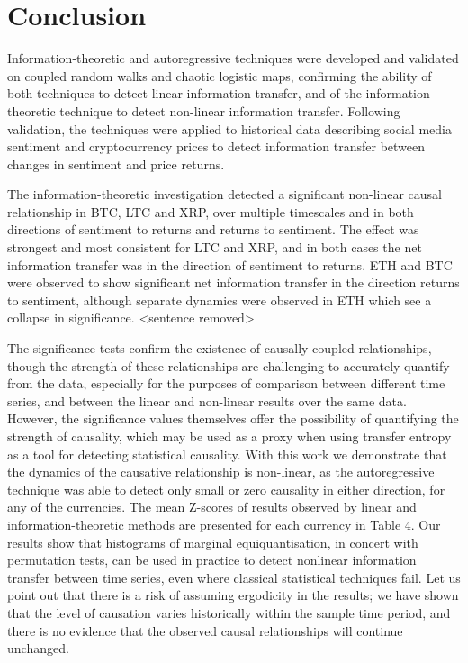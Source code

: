 \documentclass[]{rsos}%
\begin{document}
 
\clearpage
\section{Conclusion} \label{s.conclusions}

Information-theoretic and autoregressive techniques were developed and validated on coupled random walks and chaotic logistic maps, confirming the ability of both techniques to detect linear information transfer, and of the information-theoretic technique to detect non-linear information transfer. Following validation, the techniques were applied to historical data describing social media sentiment and cryptocurrency prices to detect information transfer between {\color{blue} changes in} sentiment and price {\color{blue} returns}. 

The information-theoretic investigation detected a significant non-linear causal relationship in BTC, LTC and XRP, over multiple timescales and in both directions of sentiment to {\color{blue} returns} and {\color{blue} returns} to sentiment. The effect was strongest and most consistent for LTC and XRP, and in both cases the net information transfer was in the direction of sentiment to {\color{blue} returns}. ETH and BTC were observed to show significant net information transfer in the direction {\color{blue} returns} to sentiment, although separate dynamics were observed in ETH which see a collapse in significance. {\color{blue}<sentence removed>}%

The significance tests confirm the existence of causally-coupled relationships, though the strength of these relationships are challenging to accurately quantify from the data, especially for the purposes of comparison between different time series, and between the linear and non-linear results over the same data. However, the significance values themselves offer the possibility of quantifying the strength of causality, which may be used as a proxy when using transfer entropy as a tool for detecting statistical causality. With this work we demonstrate that the dynamics of the causative relationship is non-linear, as the autoregressive technique was able to detect only small or zero causality in either direction, for any of the currencies. The mean Z-scores of results observed by linear and information-theoretic methods are presented for each currency in Table {\color{blue}4}. Our results show that histograms of marginal equiquantisation, in concert with permutation tests, can be used in practice to detect nonlinear information transfer between time series, even where classical statistical techniques fail. Let us point out that there is a risk of assuming ergodicity in the results; we have shown that the level of causation varies historically within the sample time period, and there is no evidence that the observed causal relationships will continue unchanged. 
\end{document}
